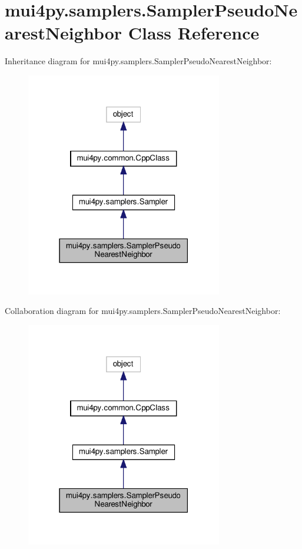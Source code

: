 \hypertarget{classmui4py_1_1samplers_1_1_sampler_pseudo_nearest_neighbor}{}\section{mui4py.\+samplers.\+Sampler\+Pseudo\+Nearest\+Neighbor Class Reference}
\label{classmui4py_1_1samplers_1_1_sampler_pseudo_nearest_neighbor}


Inheritance diagram for mui4py.\+samplers.\+Sampler\+Pseudo\+Nearest\+Neighbor\+:
\nopagebreak
\begin{figure}[H]
\begin{center}
\leavevmode
\includegraphics[width=243pt]{classmui4py_1_1samplers_1_1_sampler_pseudo_nearest_neighbor__inherit__graph}
\end{center}
\end{figure}


Collaboration diagram for mui4py.\+samplers.\+Sampler\+Pseudo\+Nearest\+Neighbor\+:
\nopagebreak
\begin{figure}[H]
\begin{center}
\leavevmode
\includegraphics[width=243pt]{classmui4py_1_1samplers_1_1_sampler_pseudo_nearest_neighbor__coll__graph}
\end{center}
\end{figure}
